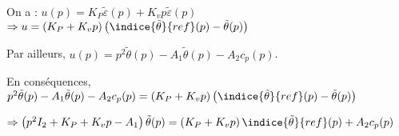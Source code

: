\documentclass[11pt]{article}
\begin{document}
\begin{UPSTIcorrige}
On a :
$u(p)=K_P\tilde{\varepsilon}(p)+K_v p \tilde{\varepsilon}(p)$
$\Rightarrow u=\left( K_P+K_v p\right) \left(\indice{\tilde{\theta}}{ref}(p) -  \tilde{\theta}(p)\right)$

Par ailleurs, $u(p)=p^2 \tilde{\theta}(p)-A_1 \tilde{\theta}(p) - A_2 c_p(p)$. 

En conséquences, 
$p^2 \tilde{\theta}(p)-A_1 \tilde{\theta}(p) - A_2 c_p(p) =\left( K_P+K_v p\right) \left(\indice{\tilde{\theta}}{ref}(p) -  \tilde{\theta}(p)\right)$

$\Rightarrow 
\left(p^2 I_2 + K_P+K_v p-A_1\right) \tilde{\theta}(p)  =\left( K_P+K_v p\right) \indice{\tilde{\theta}}{ref}(p) + A_2 c_p(p)$


%
%
\end{UPSTIcorrige}
\end{document}
